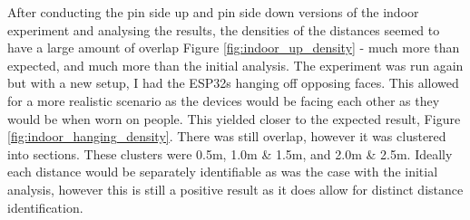 \documentclass{l4proj}
\begin{document}
After conducting the pin side up and pin side down versions of the indoor experiment and analysing the results, the densities of the distances seemed to have a large amount of overlap Figure \ref{fig:indoor_up_density} - much more than expected, and much more than the initial analysis. The experiment was run again but with a new setup, I had the ESP32s hanging off opposing faces. This allowed for a more realistic scenario as the devices would be facing each other as they would be when worn on people. This yielded closer to the expected result, Figure \ref{fig:indoor_hanging_density}. There was still overlap, however it was clustered into sections. These clusters were 0.5m, 1.0m \& 1.5m, and 2.0m \& 2.5m. Ideally each distance would be separately identifiable as was the case with the initial analysis, however this is still a positive result as it does allow for distinct distance identification.
\end{document}
